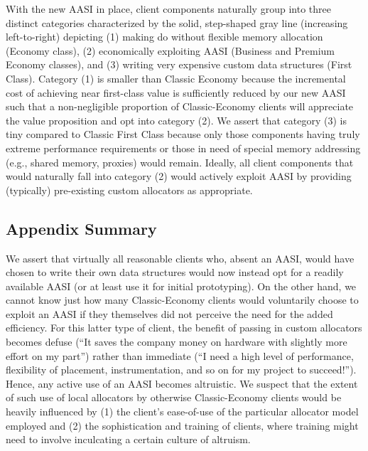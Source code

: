 With the new AASI in place, client components naturally group into three distinct
categories characterized by the solid, step-shaped gray line (increasing left-to-right)
depicting (1) making do without flexible memory allocation (Economy class), (2)
economically exploiting AASI (Business and Premium Economy classes), and (3)
writing very expensive custom data structures (First Class). Category (1) is smaller
than Classic Economy because the incremental cost of achieving near first-class
value is sufficiently reduced by our new AASI such that a non-negligible proportion
of Classic-Economy clients will appreciate the value proposition and opt into
category (2). We assert that category (3) is tiny compared to Classic First Class
because only those components having truly extreme performance requirements or
those in need of special memory addressing (e.g., shared memory, proxies) would
remain. Ideally, all client components that would naturally fall into category (2)
would actively exploit AASI by providing (typically) pre-existing custom allocators as
appropriate.

\subsection{Appendix Summary}
We assert that virtually all reasonable clients who, absent an AASI, would have
chosen to write their own data structures would now instead opt for a readily
available AASI (or at least use it for initial prototyping). On the other hand, we
cannot know just how many Classic-Economy clients would voluntarily choose to
exploit an AASI if they themselves did not perceive the need for the added efficiency.
For this latter type of client, the benefit of passing in custom allocators becomes
defuse (“It saves the company money on hardware with slightly more effort on my
part”) rather than immediate (“I need a high level of performance, flexibility of
placement, instrumentation, and so on for my project to succeed!”). Hence, any
active use of an AASI becomes altruistic. We suspect that the extent of such use of
local allocators by otherwise Classic-Economy clients would be heavily influenced by
(1) the client’s ease-of-use of the particular allocator model employed and (2) the
sophistication and training of clients, where training might need to involve
inculcating a certain culture of altruism.

